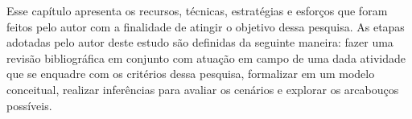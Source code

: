 Esse capítulo apresenta os recursos, técnicas, estratégias e esforços que foram feitos pelo autor com a finalidade de atingir o objetivo dessa pesquisa. As etapas adotadas pelo autor deste estudo são definidas da seguinte maneira: fazer uma revisão bibliográfica em conjunto com atuação em campo de uma dada atividade que se enquadre com os critérios dessa pesquisa, formalizar em um modelo conceitual, realizar inferências para avaliar os cenários e explorar os arcabouços possíveis.
